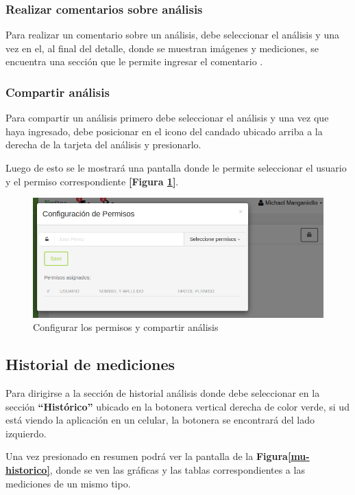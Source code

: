  \subsubsection{Realizar comentarios sobre análisis}
 Para realizar un comentario sobre un análisis, debe seleccionar el análisis y una vez en el, al final del detalle, donde se muestran imágenes y mediciones, se encuentra una sección que le permite ingresar el comentario .

\subsubsection{Compartir análisis}
Para compartir un análisis primero debe seleccionar el análisis y una vez que haya ingresado, debe posicionar en el icono del candado ubicado arriba a la derecha de la tarjeta del análisis y presionarlo. 

Luego de esto  se le mostrará una pantalla donde le permite seleccionar el usuario y el permiso correspondiente \textbf{[Figura \ref{mu-configurar_permiso}]}.

\begin{figure}
	\centering
	\includegraphics[width=.8\textwidth]{img/manual_de_usuario/configurar_permiso}
	\caption{Configurar los permisos y compartir análisis}
	\label{mu-configurar_permiso}
\end{figure}



\subsection{Historial de mediciones}
Para dirigirse a la sección de historial análisis donde debe seleccionar en la sección \textbf{``Histórico''} ubicado en la botonera vertical derecha de color verde, si ud está viendo la aplicación en un celular, la botonera se encontrará del lado izquierdo.

Una vez presionado en resumen podrá ver la pantalla de la \textbf{Figura\ref{mu-historico}}, donde se ven las gráficas y las tablas correspondientes a las mediciones de un mismo tipo.

